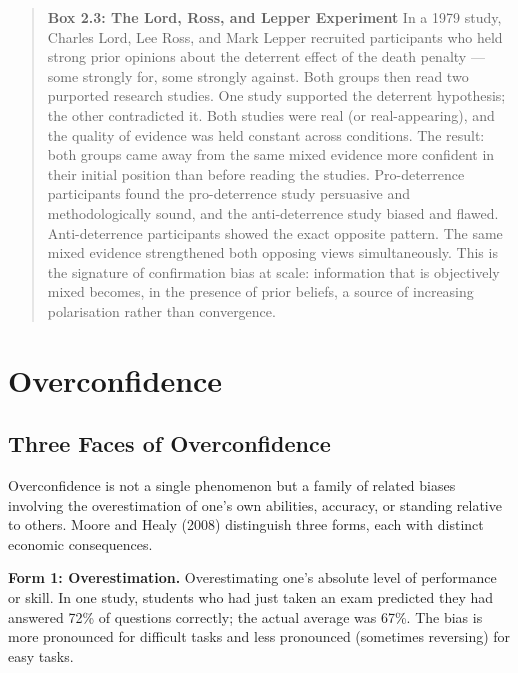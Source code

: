 \documentclass[12pt, letterpaper]{article}
\begin{document}
\begin{quote}
\textbf{Box 2.3: The Lord, Ross, and Lepper Experiment}
In a 1979 study, Charles Lord, Lee Ross, and Mark Lepper recruited participants who held strong prior opinions about the deterrent effect of the death penalty --- some strongly for, some strongly against. Both groups then read two purported research studies. One study supported the deterrent hypothesis; the other contradicted it. Both studies were real (or real-appearing), and the quality of evidence was held constant across conditions.
The result: both groups came away from the same mixed evidence more confident in their initial position than before reading the studies. Pro-deterrence participants found the pro-deterrence study persuasive and methodologically sound, and the anti-deterrence study biased and flawed. Anti-deterrence participants showed the exact opposite pattern.
The same mixed evidence strengthened both opposing views simultaneously. This is the signature of confirmation bias at scale: information that is objectively mixed becomes, in the presence of prior beliefs, a source of increasing polarisation rather than convergence.
\end{quote}

\medskip


\section{Overconfidence}



\subsection{Three Faces of Overconfidence}


Overconfidence is not a single phenomenon but a family of related biases involving the overestimation of one's own abilities, accuracy, or standing relative to others. Moore and Healy (2008) distinguish three forms, each with distinct economic consequences.

\textbf{Form 1: Overestimation.} Overestimating one's absolute level of performance or skill. In one study, students who had just taken an exam predicted they had answered 72\% of questions correctly; the actual average was 67\%. The bias is more pronounced for difficult tasks and less pronounced (sometimes reversing) for easy tasks.
\end{document}

